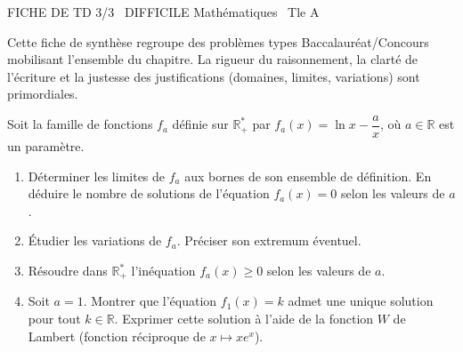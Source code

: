 \documentclass[11pt]{article}
\begin{document}
\begin{tcolorbox}[enhanced,colback=popink,colframe=popink,arc=10pt,boxrule=0pt,left=12pt,right=12pt,top=9pt,bottom=9pt]
{\color{white}\popxbold\small FICHE DE TD 3/3 \textbullet\ DIFFICILE \hfill Mathématiques \textbullet\ Tle A\par}
\end{tcolorbox}
\vspace{4pt}
Cette fiche de synthèse regroupe des problèmes types Baccalauréat/Concours mobilisant l'ensemble du chapitre. La rigueur du raisonnement, la clarté de l'écriture et la justesse des justifications (domaines, limites, variations) sont primordiales.

\begin{exercice}
Soit la famille de fonctions $f_a$ définie sur $\mathbb{R}^*_+$ par $f_a(x) = \ln x - \dfrac{a}{x}$, où $a \in \mathbb{R}$ est un paramètre.
\begin{enumerate}
    \item Déterminer les limites de $f_a$ aux bornes de son ensemble de définition. En déduire le nombre de solutions de l'équation $f_a(x) = 0$ selon les valeurs de $a$.
    \item Étudier les variations de $f_a$. Préciser son extremum éventuel.
    \item Résoudre dans $\mathbb{R}^*_+$ l'inéquation $f_a(x) \geqslant 0$ selon les valeurs de $a$.
    \item Soit $a = 1$. Montrer que l'équation $f_1(x) = k$ admet une unique solution pour tout $k \in \mathbb{R}$. Exprimer cette solution à l'aide de la fonction $W$ de Lambert (fonction réciproque de $x \mapsto x e^x$).
\end{enumerate}
\end{exercice}
\end{document}
